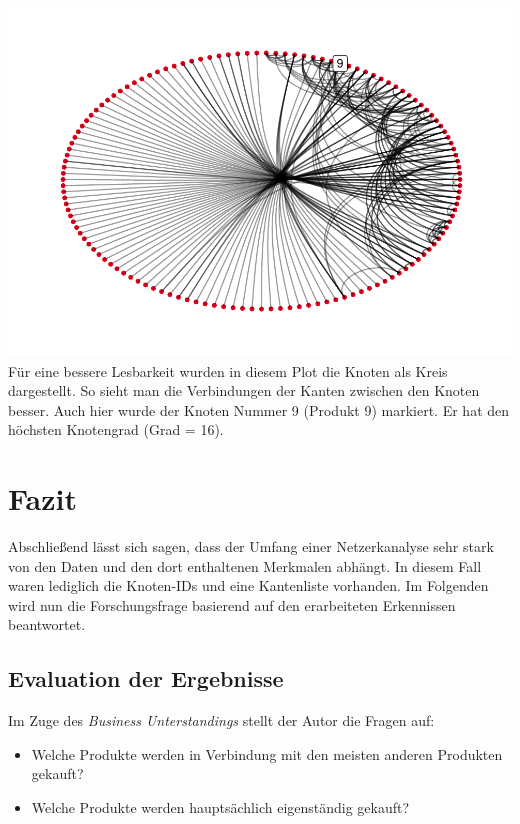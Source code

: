 \documentclass[
  12 pt,
]{article}
\providecommand{\tightlist}{%
  \setlength{\itemsep}{0pt}\setlength{\parskip}{0pt}}
\begin{document}
\includegraphics{BUBECK_FERDINAND_SNA_Assignment_files/figure-latex/unnamed-chunk-4-1.pdf}
Für eine bessere Lesbarkeit wurden in diesem Plot die Knoten als Kreis
dargestellt. So sieht man die Verbindungen der Kanten zwischen den
Knoten besser. Auch hier wurde der Knoten Nummer 9 (Produkt 9) markiert.
Er hat den höchsten Knotengrad (Grad = 16).

\newpage

\hypertarget{fazit}{%
\section{Fazit}\label{fazit}}

Abschließend lässt sich sagen, dass der Umfang einer Netzerkanalyse sehr
stark von den Daten und den dort enthaltenen Merkmalen abhängt. In
diesem Fall waren lediglich die Knoten-IDs und eine Kantenliste
vorhanden. Im Folgenden wird nun die Forschungsfrage basierend auf den
erarbeiteten Erkennissen beantwortet.

\hypertarget{evaluation-der-ergebnisse}{%
\subsection{Evaluation der Ergebnisse}\label{evaluation-der-ergebnisse}}

Im Zuge des \emph{Business Unterstandings} stellt der Autor die Fragen
auf:\\

\begin{itemize}
\tightlist
\item
  Welche Produkte werden in Verbindung mit den meisten anderen Produkten
  gekauft?
\item
  Welche Produkte werden hauptsächlich eigenständig gekauft?\\
\end{itemize}
\end{document}
